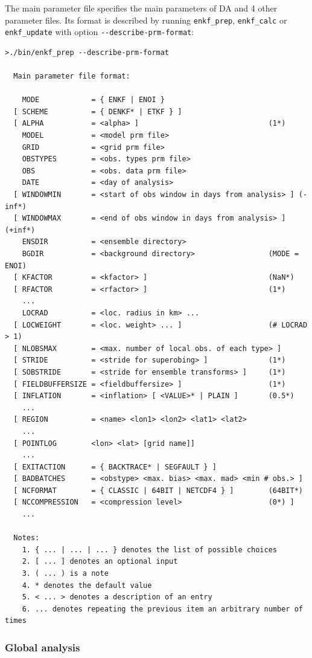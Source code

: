 \documentclass[11pt]{report}
\begin{document}
The main parameter file specifies the main parameters of DA and 4 other parameter files.
Its format is described by running \verb|enkf_prep|, \verb|enkf_calc| or \verb|enkf_update| with option \verb|--describe-prm-format|:
\begin{Verbatim}[frame=single,fontsize=\footnotesize]
>./bin/enkf_prep --describe-prm-format

  Main parameter file format:

    MODE            = { ENKF | ENOI }
  [ SCHEME          = { DENKF* | ETKF } ]
  [ ALPHA           = <alpha> ]                              (1*)
    MODEL           = <model prm file>
    GRID            = <grid prm file>
    OBSTYPES        = <obs. types prm file>
    OBS             = <obs. data prm file>
    DATE            = <day of analysis>
  [ WINDOWMIN       = <start of obs window in days from analysis> ] (-inf*)
  [ WINDOWMAX       = <end of obs window in days from analysis> ]   (+inf*)
    ENSDIR          = <ensemble directory>
    BGDIR           = <background directory>                 (MODE = ENOI)
  [ KFACTOR         = <kfactor> ]                            (NaN*)
  [ RFACTOR         = <rfactor> ]                            (1*)
    ...
    LOCRAD          = <loc. radius in km> ...
  [ LOCWEIGHT       = <loc. weight> ... ]                    (# LOCRAD > 1)
  [ NLOBSMAX        = <max. number of local obs. of each type> ]
  [ STRIDE          = <stride for superobing> ]              (1*)
  [ SOBSTRIDE       = <stride for ensemble transforms> ]     (1*)
  [ FIELDBUFFERSIZE = <fieldbuffersize> ]                    (1*)
  [ INFLATION       = <inflation> [ <VALUE>* | PLAIN ]       (0.5*)
    ...
  [ REGION          = <name> <lon1> <lon2> <lat1> <lat2>
    ...
  [ POINTLOG        <lon> <lat> [grid name]]
    ...
  [ EXITACTION      = { BACKTRACE* | SEGFAULT } ]
  [ BADBATCHES      = <obstype> <max. bias> <max. mad> <min # obs.> ]
  [ NCFORMAT        = { CLASSIC | 64BIT | NETCDF4 } ]        (64BIT*)
  [ NCCOMPRESSION   = <compression level>                    (0*) ]
    ...

  Notes:
    1. { ... | ... | ... } denotes the list of possible choices
    2. [ ... ] denotes an optional input
    3. ( ... ) is a note
    4. * denotes the default value
    5. < ... > denotes a description of an entry
    6. ... denotes repeating the previous item an arbitrary number of times
\end{Verbatim}

\subsubsection{Global analysis}
\end{document}
